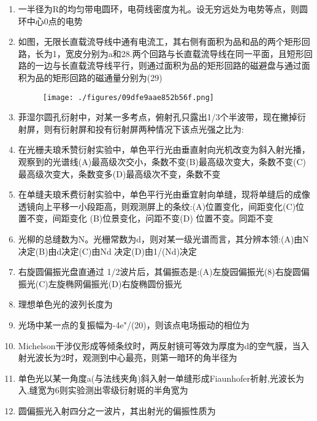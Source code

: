 \begin{enumerate}
\item 一半径为R的均匀带电圆环，电荷线密度为礼。设无穷远处为电势等点，则圆环中心0点的电势
\item 如图，无限长直载流导线中通有电流工，其右侧有面积为品和品的两个矩形回路，长为1，宽皮分别为a和28.两个回路与长直载流导线在同一平面，且短形回路的一边与长直载流导线平行，则通过面积为品的矩形回路的磁避盘与通过面积为品的矩形回路的磁通量分别为(29)
\begin{figure}[ht]
\centering
\texttt{[image: ./figures/09dfe9aae852b56f.png]}
\caption{} \label{fig_HDSD13_5}
\end{figure}
\item 菲湿尔圆孔衍射中，对某一多考点，俯射孔只露出1/3个半波带，现在撇掉衍射屏，则有衍射屏和投有衍射屏两种情况下该点光强之比为:
\item 在光栅夫琅禾赞衍射实验中，单色平行光由垂直射向光机改变为斜入射光播，观察到的光谱线(A)最高级次交小，条数不变(B)最高级次变大，条数不变(C)最高级次变大，条数变多(D)最高级次不变，条数不变
\item 在单缝夫琅禾费衍射实验中，单色平行光由垂宜射向单缝，现将单缝后的成像透镜向上平移一小段距高，则观测屏上的条纹:(A)位置变化，间距变化(C)位置不变，间距变化
(B)位景变化，问距不变(D) 位置不变。同距不变
\item 光柳的总缝数为N。光栅常数为d，则对某一级光谱而言，其分辨本领:(A)由N决定(B)由d决定(C)由Nd 决定(D)由1/(Nd)决定
\item 右旋圆偏振光盘直通过 1/2波片后，其偏振态是:(A)左旋园偏振光(8)右旋圆偏振光(C)左旋椭网偏振光(D)右旋椭圆份振光
\item 理想单色光的波列长度为
\item 光场中某一点的复振幅为-4e"/(20)，则该点电场振动的相位为
\item Michelson干涉仪形成等倾条纹时，两反射镜可等效为厚度为d的空气膜，当入射光波长为2时，观测到中心最亮，则第一暗环的角半径为
\item 单色光以某一角度a(与法线夹角)斜入射一单缝形成Fiaunhofer祈射,光波长为入,缝宽为6则实验测出零级衍射斑的半角宽为
\item 圆偏振光入射四分之一波片，其出射光的偏振性质为
\end{enumerate}
